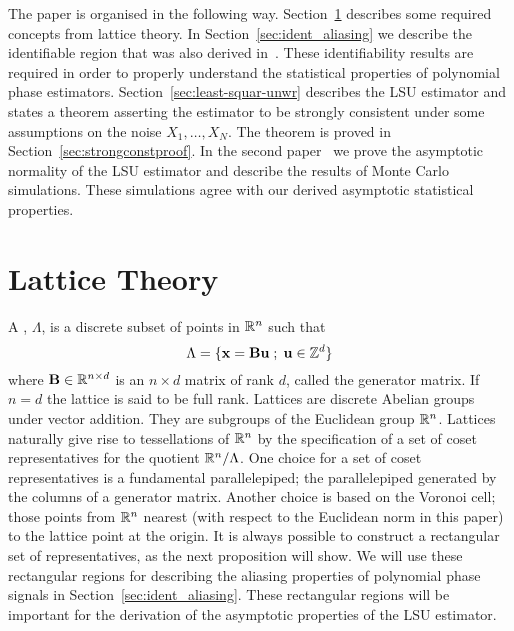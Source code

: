 \documentclass[journal]{IEEEtran}
\begin{document}
The paper is organised in the following way. Section~\ref{sec:lattice-theory} describes some required concepts from lattice theory.  In Section~\ref{sec:ident_aliasing} we describe the identifiable region that was also derived in~\cite{McKilliam2009IndentifiabliltyAliasingPolyphase}.  These identifiability results are required in order to properly understand the statistical properties of polynomial phase estimators.  Section~\ref{sec:least-squar-unwr} describes the LSU estimator and states a theorem asserting the estimator to be strongly consistent under some assumptions on the noise $X_1,\dots,X_N$. The theorem is proved in Section~\ref{sec:strongconstproof}.  In the second paper~\cite{McKilliam_pps2_2012} we prove the asymptotic normality of the LSU estimator and describe the results of Monte Carlo simulations.  These simulations agree with our derived asymptotic statistical properties. 



\section{Lattice Theory}\label{sec:lattice-theory}

A ,  $\Lambda$, is a discrete subset of points in ${\mathbb R}^n$ such that
\[
   \Lambda = \{\mathbf{x} = \mathbf{B}\mathbf{u} \; ; \; \mathbf{u} \in {\mathbb Z}^d \}
\]
where $\mathbf{B} \in {\mathbb R}^{n \times d}$ is an $n \times d$ matrix of rank $d$, called the generator matrix.  If $n = d$ the lattice is said to be full rank.  Lattices are discrete Abelian groups under vector addition.  They are subgroups of the Euclidean group ${\mathbb R}^n$.  Lattices naturally give rise to tessellations of ${\mathbb R}^n$ by the specification of a set of coset representatives for the quotient ${\mathbb R}^n / \Lambda$.  One choice for a set of coset representatives is a fundamental parallelepiped; the parallelepiped generated by the columns of a generator matrix.  Another choice is based on the Voronoi cell; those points from ${\mathbb R}^n$ nearest (with respect to the Euclidean norm in this paper) to the lattice point at the origin.  It is always possible to construct a rectangular set of representatives, as the next proposition will show.  We will use these rectangular regions for describing the aliasing properties of polynomial phase signals in Section~\ref{sec:ident_aliasing}.  These rectangular regions will be important for the derivation of the asymptotic properties of the LSU estimator.
\end{document}
